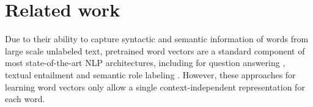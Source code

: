 \documentclass[11pt,a4paper]{article}
\newcommand{\ELMO}{ELMo}
\newcommand\micomment[1]{\textcolor{red}{\textbf{[#1] --\textsc{MI}}}}
\begin{document}


\section{Related work}


Due to their ability to capture syntactic and semantic information of words from large scale unlabeled text, pretrained word vectors \citep{Turian2010WordRA,word2vec,Pennington2014GloveGV} are a standard component of most state-of-the-art NLP architectures, including for question answering \citep{liu2017stochastic}, textual entailment \citep{Chen2017EnhancedLF} and semantic role labeling \citep{He2017DeepSR}.
However, these approaches for learning word vectors only allow a single context-independent representation for each word.
\end{document}
